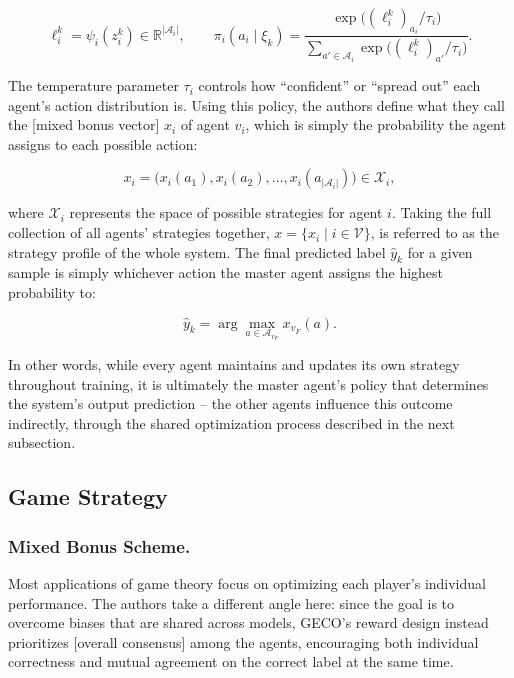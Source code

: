 \documentclass[manuscript,review]{acmart}
\begin{document}
\begin{equation}
\ell_i^k = \psi_i(z_i^k) \in \mathbb{R}^{|\mathcal{A}_i|}, \qquad
\pi_i(a_i \mid \xi_k) = \frac{\exp\big((\ell_i^k)_{a_i}/\tau_i\big)}{\sum_{a' \in \mathcal{A}_i} \exp\big((\ell_i^k)_{a'}/\tau_i\big)}.
\end{equation}

The temperature parameter $\tau_i$ controls how ``confident'' or ``spread out'' each
agent's action distribution is. Using this policy, the authors define what they call the
[mixed bonus vector] $x_i$ of agent $v_i$, which is simply the probability the agent
assigns to each possible action:

\begin{equation}
x_i = \big(x_i(a_1), x_i(a_2), \dots, x_i(a_{|\mathcal{A}_i|})\big) \in \mathcal{X}_i,
\end{equation}

where $\mathcal{X}_i$ represents the space of possible strategies for agent $i$. Taking
the full collection of all agents' strategies together, $x = \{x_i \mid i \in
\mathcal{V}\}$, is referred to as the strategy profile of the whole system. The final
predicted label $\hat{y}_k$ for a given sample is simply whichever action the master agent
assigns the highest probability to:

\begin{equation}
\hat{y}_k = \arg\max_{a \in \mathcal{A}_{v_F}} x_{v_F}(a).
\end{equation}

In other words, while every agent maintains and updates its own strategy throughout
training, it is ultimately the master agent's policy that determines the system's output
prediction -- the other agents influence this outcome indirectly, through the shared
optimization process described in the next subsection.

\subsection{Game Strategy}

\subsubsection{\textbf{Mixed Bonus Scheme.} \newline}

Most applications of game theory focus on optimizing each player's individual
performance. The authors take a different angle here: since the goal is to overcome
biases that are shared across models, GECO's reward design instead prioritizes
[overall consensus] among the agents, encouraging both individual correctness and
mutual agreement on the correct label at the same time.
\end{document}

